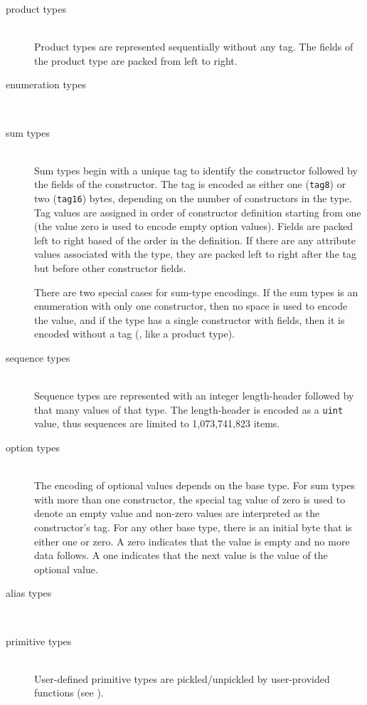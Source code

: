 \begin{description}
  \item[product types] \mbox{}\\ 
    Product types are represented sequentially without any tag.
    The fields of the product type are packed from left to right.

  \item[enumeration types] \mbox{}\\

  \item[sum types] \mbox{}\\
    Sum types begin with a unique tag to identify the constructor
    followed by the fields of the constructor.
    The tag is encoded as either one (\lstinline!tag8!) or two (\lstinline!tag16!)
    bytes, depending on the number of constructors in the type.
    Tag values are assigned in order of constructor definition starting from one (the
    value zero is used to encode empty option values).
    Fields are packed left to right based of the order in the definition.
    If there are any attribute values associated with the type, they are packed left to right
    after the tag but before other constructor fields.
    
    There are two special cases for sum-type encodings.
    If the sum types is an enumeration with only one constructor, then no space is used to
    encode the value, and if the type has a single constructor with fields, then it is
    encoded without a tag (\ie{}, like a product type).

  \item[sequence types] \mbox{}\\
    Sequence types are represented with an integer length-header followed by
    that many values of that type.
    The length-header is encoded as a \lstinline!uint! value, thus sequences are limited
    to 1,073,741,823 items.

  \item[option types] \mbox{}\\
    The encoding of optional values depends on the base type.
    For sum types with more than one constructor, the special tag value of zero is
    used to denote an empty value and non-zero values are interpreted as
    the constructor's tag.
    For any other base type, there is an initial byte that is either one or zero.
    A zero indicates that the value is empty and no more data follows.
    A one indicates that the next value is the value of the optional value.

  \item[alias types] \mbox{} \\

  \item[primitive types] \mbox{}\\
    User-defined primitive types are pickled/unpickled by user-provided functions (see
    ).
\end{description}%

